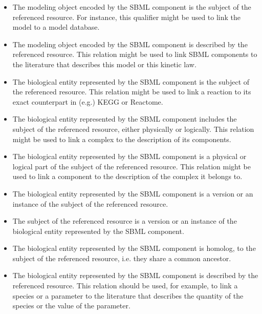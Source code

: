 \begin{itemize}

\item {} The modeling object encoded by the SBML
  component is the subject of the referenced resource. For
  instance, this qualifier might be used to link the model to a
  model database.

\item {} The modeling object
  encoded by the SBML component is described by
  the referenced resource. This relation might be used to link
  SBML components to the literature that describes this model or
  this kinetic law.

\item {} The biological entity represented by the
  SBML component is the subject of the referenced resource. This
  relation might be used to link a reaction to its exact
  counterpart in (e.g.) KEGG or Reactome.

\item {} The biological entity represented by
  the SBML component includes the subject of the referenced
  resource, either physically or logically. This relation might be
  used to link a complex to the description of its components.

\item {} The biological entity represented by
  the SBML component is a physical or logical part of the subject
  of the referenced resource. This relation might be used to link
  a component to the description of the complex it belongs to.

\item {} The biological entity represented
  by the SBML component is a version or an instance of the subject
  of the referenced resource.

\item {} The subject of the referenced
  resource is a version or an instance of the biological entity
  represented by the SBML component.

\item {} The biological entity represented
  by the SBML component is homolog, to the subject of the
  referenced resource, i.e. they share a common ancestor.

\item {} The biological entity
  represented by the SBML component is described by the referenced
  resource. This relation should be used, for example, to link a
  species or a parameter to the literature that describes the
  quantity of the species or the value of the parameter.



\end{itemize}
